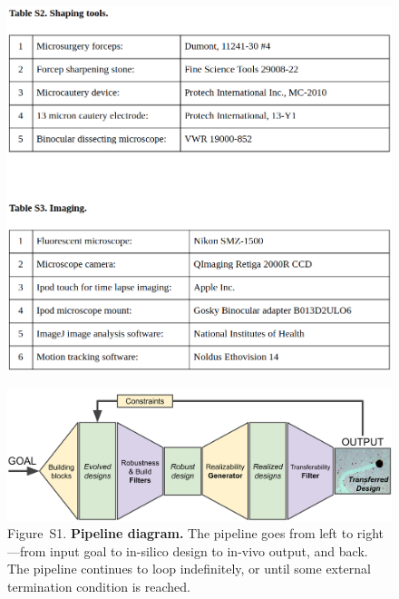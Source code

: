 \newpage


\begin{figure}[t]
\centering
\includegraphics[width=\linewidth]{Chapter07/img/Tables2and3.png}
\end{figure}



\begin{figure}[t]
\centering
\includegraphics[width=\linewidth]{Chapter07/img/SupplementalPipeline.png}
\caption*{Figure~S1. \textbf{Pipeline diagram.} The pipeline goes from left to right---from input goal to in-silico design to in-vivo output, and back. The pipeline continues to loop indefinitely, or until some external termination condition is reached.
}
\end{figure}


